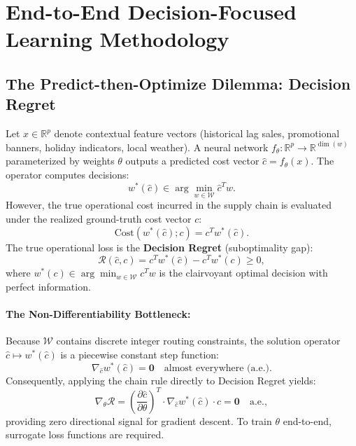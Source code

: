 \documentclass[11pt,a4paper]{article}
\theoremstyle{definition}
\theoremstyle{remark}
\begin{document}
\section{End-to-End Decision-Focused Learning Methodology}
\label{sec:methodology}

\subsection{The Predict-then-Optimize Dilemma: Decision Regret}
Let $x \in \mathbb{R}^p$ denote contextual feature vectors (historical lag sales, promotional banners, holiday indicators, local weather). A neural network $f_\theta: \mathbb{R}^p \to \mathbb{R}^{\dim(w)}$ parameterized by weights $\theta$ outputs a predicted cost vector $\hat{c} = f_\theta(x)$. The operator computes decisions:
    \begin{equation*}
        w^*(\hat{c}) \in \arg\min_{w \in \mathcal{W}} \hat{c}^T w.
    \end{equation*}
However, the true operational cost incurred in the supply chain is evaluated under the realized ground-truth cost vector $c$:
    \begin{equation*}
        \text{Cost}(w^*(\hat{c}); c) = c^T w^*(\hat{c}).
    \end{equation*}
The true operational loss is the \textbf{Decision Regret} (suboptimality gap):
\begin{equation}
    \mathcal{R}(\hat{c}, c) = c^T w^*(\hat{c}) - c^T w^*(c) \ge 0, \label{eq:regret_def}
\end{equation}
where $w^*(c) \in \arg\min_{w \in \mathcal{W}} c^T w$ is the clairvoyant optimal decision with perfect information.

\paragraph{The Non-Differentiability Bottleneck:}
Because $\mathcal{W}$ contains discrete integer routing constraints, the solution operator $\hat{c} \mapsto w^*(\hat{c})$ is a piecewise constant step function:
    \begin{equation*}
        \nabla_{\hat{c}} w^*(\hat{c}) = \mathbf{0} \quad \text{almost everywhere (a.e.)}.
    \end{equation*}
Consequently, applying the chain rule directly to Decision Regret yields:
    \begin{equation*}
        \nabla_\theta \mathcal{R} = \left( \frac{\partial \hat{c}}{\partial \theta} \right)^T \cdot \nabla_{\hat{c}} w^*(\hat{c}) \cdot c = \mathbf{0} \quad \text{a.e.},
    \end{equation*}
providing zero directional signal for gradient descent. To train $\theta$ end-to-end, surrogate loss functions are required.
\end{document}
